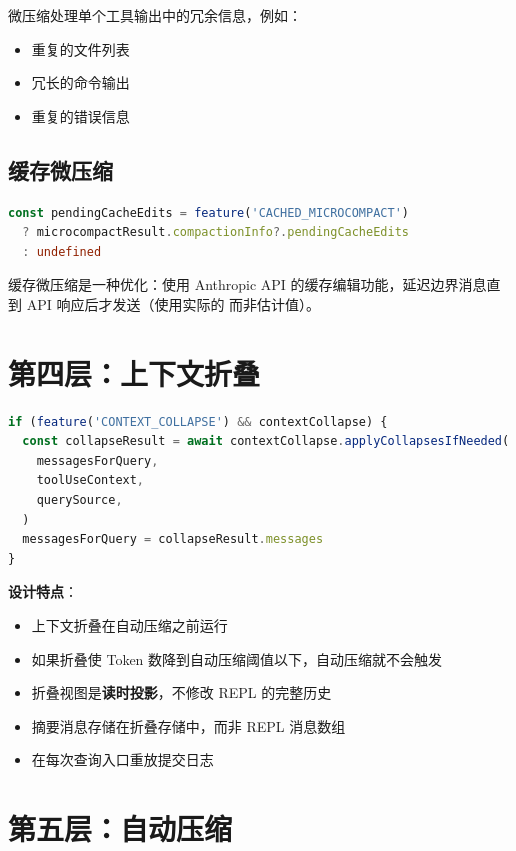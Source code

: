 微压缩处理单个工具输出中的冗余信息，例如：
\begin{itemize}[nosep]
  \item 重复的文件列表
  \item 冗长的命令输出
  \item 重复的错误信息
\end{itemize}

\subsection{缓存微压缩}

\begin{lstlisting}[language=TypeScript,breaklines=true]
const pendingCacheEdits = feature('CACHED_MICROCOMPACT')
  ? microcompactResult.compactionInfo?.pendingCacheEdits
  : undefined
\end{lstlisting}

缓存微压缩是一种优化：使用 Anthropic API 的缓存编辑功能，延迟边界消息直到 API 响应后才发送（使用实际的  而非估计值）。

\section{第四层：上下文折叠}

\begin{lstlisting}[language=TypeScript,breaklines=true]
if (feature('CONTEXT_COLLAPSE') && contextCollapse) {
  const collapseResult = await contextCollapse.applyCollapsesIfNeeded(
    messagesForQuery,
    toolUseContext,
    querySource,
  )
  messagesForQuery = collapseResult.messages
}
\end{lstlisting}

\textbf{设计特点}：
\begin{itemize}[nosep]
  \item 上下文折叠在自动压缩之前运行
  \item 如果折叠使 Token 数降到自动压缩阈值以下，自动压缩就不会触发
  \item 折叠视图是\textbf{读时投影}，不修改 REPL 的完整历史
  \item 摘要消息存储在折叠存储中，而非 REPL 消息数组
  \item {} 在每次查询入口重放提交日志
\end{itemize}

\section{第五层：自动压缩}

